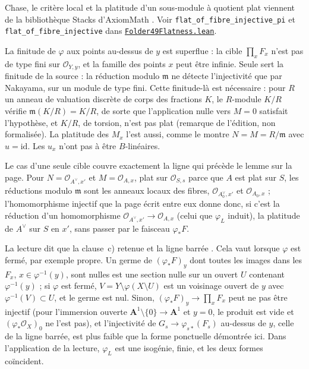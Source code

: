 \noindent Chase, le critère local et la platitude d'un sous-module à quotient plat viennent de la bibliothèque Stacks d'AxiomMath \cite{axiomstacks}. Voir \texttt{flat\_of\_fibre\_injective\_pi} et \texttt{flat\_of\_fibre\_injective} dans \href{\leanblobmain/AlgebraicGeometry/Folder49Flatness.lean}{\texttt{Folder49Flatness.\allowbreak{}lean}}.

\begin{remarque}
La finitude de $\varphi$ aux points au-dessus de $y$ est superflue : la cible $\prod_x F_x$ n'est pas de type fini sur $\mathcal O_{Y,y}$, et la famille des points $x$ peut être infinie. Seule sert la finitude de la source : la réduction modulo $\mathfrak m$ ne détecte l'injectivité que par Nakayama, sur un module de type fini. Cette finitude-là est nécessaire : pour $R$ un anneau de valuation discrète de corps des fractions $K$, le $R$-module $K/R$ vérifie $\mathfrak m(K/R) = K/R$, de sorte que l'application nulle vers $M = 0$ satisfait l'hypothèse, et $K/R$, de torsion, n'est pas plat (remarque de l'édition, non formalisée). La platitude des $M_x$ l'est aussi, comme le montre $N = M = R/\mathfrak m$ avec $u = \mathrm{id}$. Les $u_x$ n'ont pas à être $B$-linéaires.
\end{remarque}

\begin{remarque}
Le cas d'une seule cible couvre exactement la ligne qui précède le lemme sur la page. Pour $N = \mathcal O_{A^\vee, x'}$ et $M = \mathcal O_{A, x}$, plat sur $\mathcal O_{S,s}$ parce que $A$ est plat sur $S$, les réductions modulo $\mathfrak m$ sont les anneaux locaux des fibres, $\mathcal O_{A^\vee_0, x'}$ et $\mathcal O_{A_0, x}$ ; l'homomorphisme injectif que la page écrit entre eux donne donc, si c'est la réduction d'un homomorphisme $\mathcal O_{A^\vee, x'} \to \mathcal O_{A, x}$ (celui que $\varphi_L$ induit), la platitude de $A^\vee$ sur $S$ en $x'$, sans passer par le faisceau $\varphi_*F$.
\end{remarque}

\begin{remarque}
La lecture dit que la clause~c) retenue et la ligne barrée . Cela vaut lorsque $\varphi$ est fermé, par exemple propre. Un germe de $(\varphi_*F)_y$ dont toutes les images dans les $F_x$, $x \in \varphi^{-1}(y)$, sont nulles est une section nulle sur un ouvert $U$ contenant $\varphi^{-1}(y)$ ; si $\varphi$ est fermé, $V = Y \setminus \varphi(X \setminus U)$ est un voisinage ouvert de $y$ avec $\varphi^{-1}(V) \subset U$, et le germe est nul. Sinon, $(\varphi_*F)_y \to \prod_x F_x$ peut ne pas être injectif (pour l'immersion ouverte $\mathbf A^1 \setminus \{0\} \to \mathbf A^1$ et $y = 0$, le produit est vide et $(\varphi_*\mathcal O_X)_0$ ne l'est pas), et l'injectivité de $G_s \to \varphi_{s*}(F_s)$ au-dessus de $y$, celle de la ligne barrée, est plus faible que la forme ponctuelle démontrée ici. Dans l'application de la lecture, $\varphi_L$ est une isogénie, finie, et les deux formes coïncident.
\end{remarque}

